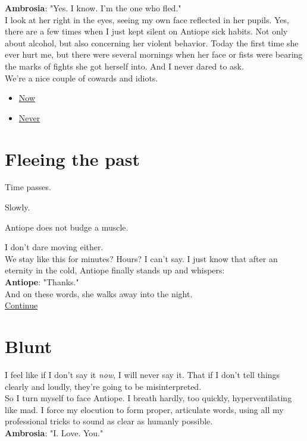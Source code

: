 \documentclass{report}
\newcommand{\speaker}[1]{
	\textbf{#1}: 
}
\newcommand{\glink}[2]{
	\hyperref[#1]{#2}
}
\newcommand{\gsection}[1]{
	\section*{#1}
	\label{#1}
}
\begin{document}
\speaker{Ambrosia} "Yes. I know. I'm the one who fled."\\

I look at her right in the eyes, seeing my own face reflected in her pupils. Yes, there are a few times when I just kept silent on Antiope sick habits. Not only about alcohol, but also concerning her violent behavior. Today the first time she ever hurt me, but there were several mornings when her face or fists were bearing the marks of fights she got herself into. And I never dared to ask.\\

We're a nice couple of cowards and idiots.\\

\begin{itemize}
	\item \glink{Declaration}{Now}
	\item \glink{Friends}{Never}
\end{itemize}

\gsection{Fleeing the past}

Time passes.

Slowly.

Antiope does not budge a muscle.

I don't dare moving either.\\

We stay like this for minutes? Hours? I can't say. I just know that after an eternity in the cold, Antiope finally stands up and whispers:\\

\speaker{Antiope} "Thanks."\\

And on these words, she walks away into the night.\\

\glink{Masks}{Continue}

\gsection{Blunt}

I feel like if I don't say it \emph{now}, I will never say it. That if I don't tell things clearly and loudly, they're going to be misinterpreted.\\

So I turn myself to face Antiope. I breath hardly, too quickly, hyperventilating like mad. I force my elocution to form proper, articulate words, using all my professional tricks to sound as clear as humanly possible.\\

\speaker{Ambrosia} "I. Love. You."\\
\end{document}
